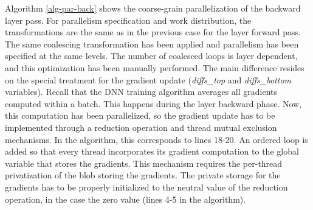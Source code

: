 Algorithm \ref{alg-par-back} shows the coarse-grain parallelization of 
the backward layer pass. For parallelism specification and work 
distribution, the transformations are the same as in the previous 
case for the layer forward pass. The same coalescing transformation has 
been applied and parallelism has been specified at the same levels. 
The number of coalesced loops is layer dependent, and this optimization 
has been manually performed. The main difference resides on the special 
treatment for the gradient update (\emph{diffs\_top} and \emph{diffs\_bottom} 
variables). Recall that the DNN training algorithm averages all gradients 
computed within a batch. This happens during the layer backward phase.
Now, this computation has been parallelized, so the gradient update has 
to be implemented through a reduction operation and thread mutual exclusion 
mechanisms. In the algorithm, this corresponds to lines 18-20. An ordered loop 
is added so that every thread incorporates its gradient computation to 
the global variable that stores the gradients.
This mechanism requires the per-thread privatization of the blob storing 
the gradients. The private storage for the gradients has to be properly 
initialized to the neutral value of the reduction operation, in the case 
the zero value (lines 4-5 in the algorithm). 




